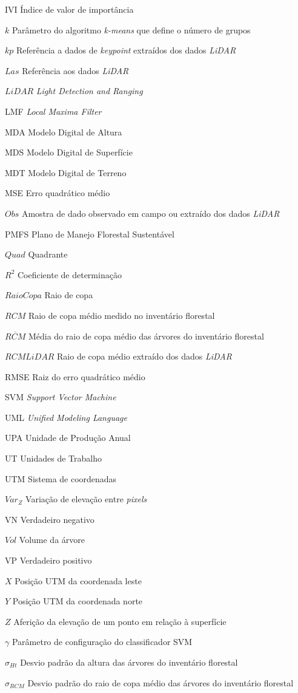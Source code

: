 \documentclass[
	12pt,				%
	openright,			%
	twoside,			%
	a4paper,			%
	chapter=TITLE,		%
	sumario=abnt-6027-2012,
	english,			%
	brazil				%
	]{UFVJM-abntex2}
\begin{document}
\begin{siglas}
\item[IVI] Índice de valor de importância
\item[$k$] Parâmetro do algoritmo \textit{k-means} que define o número de grupos
\item[$kp$] Referência a dados de \textit{keypoint} extraídos dos dados \textit{LiDAR}
\item[$Las$] Referência aos dados \textit{LiDAR}
\item[$LiDAR$] \textit{Light Detection and Ranging}
\item[LMF] \textit{Local Maxima Filter}
\item[MDA] Modelo Digital de Altura
\item[MDS] Modelo Digital de Superfície
\item[MDT] Modelo Digital de Terreno
\item[MSE] Erro quadrático médio
\item[$Obs$] Amostra de dado observado em campo ou extraído dos dados \textit{LiDAR}
\item[PMFS] Plano de Manejo Florestal Sustentável
\item[$Quad$] Quadrante
\item[$R^2$] Coeficiente de determinação
\item[$RaioCopa$] Raio de copa
\item[$RCM$] Raio de copa médio medido no inventário florestal
\item[$\overline{RCM}$] Média do raio de copa médio das árvores do inventário florestal
\item[$RCM{LiDAR}$] Raio de copa médio extraído dos dados \textit{LiDAR}
\item[RMSE] Raiz do erro quadrático médio
\item[SVM] \textit{Support Vector Machine}
\item[UML] \textit{Unified Modeling Language}
\item[UPA] Unidade de Produção Anual
\item[UT] Unidades de Trabalho
\item[UTM] Sistema de coordenadas
\item[$Var_{Z}$] Variação de elevação entre \textit{pixels}
\item[VN] Verdadeiro negativo
\item[$Vol$] Volume da árvore
\item[VP] Verdadeiro positivo
\item[$X$] Posição UTM da coordenada leste
\item[$Y$] Posição UTM da coordenada norte
\item[$Z$] Aferição da elevação de um ponto em relação à superfície
\item[$\gamma$] Parâmetro de configuração do classificador SVM
\item[$\sigma_{Ht}$] Desvio padrão da altura das árvores do inventário florestal
\item[$\sigma_{RCM}$] Desvio padrão do raio de copa médio das árvores do inventário florestal




\end{siglas}
\end{document}
